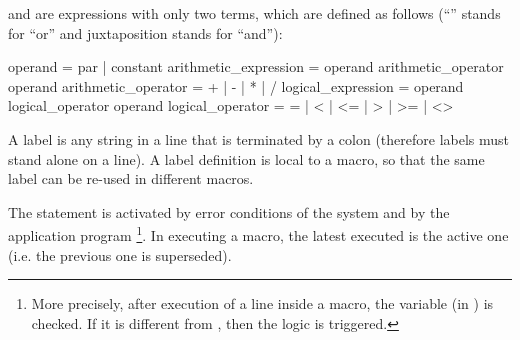  and
 are expressions with only two terms,
which are defined as follows (``\Lit{|}'' stands for ``or'' 
and juxtaposition stands for ``and''):
\begin{XMP}
operand                 =   par  |  constant
arithmetic_expression   =   operand  arithmetic_operator  operand
arithmetic_operator     =   +  |  -  |  *  |  /
logical_expression      =   operand  logical_operator  operand
logical_operator        =   =  |  <  |  <=  |  >  |  >=  |  <>
\end{XMP}

A label is any string in a line that is terminated by a colon
(therefore labels must stand alone on a line).
A label definition is local to a macro, so that
the same label can be re-used in different macros.

The  
statement is activated by error conditions of the
system and by the application program%
\footnote{More precisely,
after execution of a line inside a macro, the variable
 (in ) is checked. 
If it is different from , then the  logic is triggered.}.
In executing a macro, the latest  executed is the active one
(i.e. the previous one is superseded).

